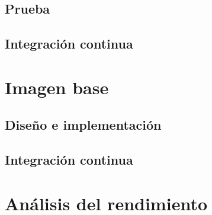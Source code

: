 \subsection{Prueba}

\subsection{Integración continua}

\section{Imagen base}

\subsection{Diseño e implementación}

\subsection{Integración continua}

\section{Análisis del rendimiento}